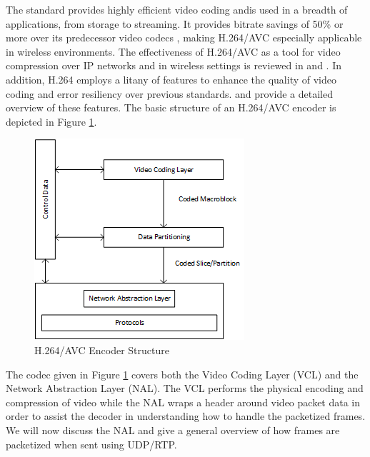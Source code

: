 The standard provides highly efficient video coding andis used in a breadth of applications, from storage to streaming. It provides bitrate savings of 50\% or more over its predecessor video codecs \cite{RTP}, making H.264/AVC especially applicable in wireless environments. The effectiveness of H.264/AVC as a tool for video compression over IP networks and in wireless settings is reviewed  in \cite{H264OverIP} and \cite{WirelessH264}. In addition, H.264 employs a litany of features to enhance the quality of video coding and error resiliency over previous standards. \cite{H264AVCOverview} and \cite{H264Spec} provide a detailed overview of these features. The basic structure of an H.264/AVC encoder is depicted in Figure \ref{fig:H264EncoderStructure}.
\begin{figure}[H]
\centering
\includegraphics[width=0.4\linewidth]{images/H264AVCEncoderStructure.png}
\caption{H.264/AVC Encoder Structure \cite{H264AVCOverview}}
\label{fig:H264EncoderStructure}
\end{figure}
The codec given in Figure \ref{fig:H264EncoderStructure} covers both the Video Coding Layer (VCL) and the Network Abstraction Layer (NAL). The VCL performs the physical encoding and compression of video while the NAL wraps a header around video packet data in order to assist the decoder in understanding how to handle the packetized frames. We will now discuss the NAL and give a general overview of how frames are packetized when sent using UDP/RTP. 

